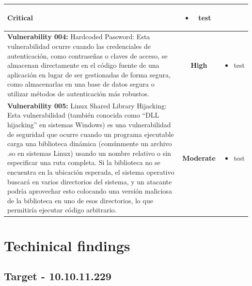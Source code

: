 \documentclass[a4paper]{article} %
\begin{document}
\begin{table}[htbp]
\begin{tabularx}{\textwidth}{|X|c|X|}
            \cellcolor{criticalColor}\textbf{Critical} &
                \begin{itemize}
                    \item test
                \end{itemize} \\
            \hline
            \textbf{Vulnerability 004:} Hardcoded Password: Esta vulnerabilidad ocurre cuando las credenciales de autenticación, como contraseñas o claves de acceso, se almacenan directamente en el código fuente de una aplicación en lugar de ser gestionadas de forma segura, como almacenarlas en una base de datos segura o utilizar métodos de autenticación más robustos.&
            \cellcolor{highColor}\textbf{High} &
                \begin{itemize}
                    \item test
                \end{itemize} \\
            \hline
            \textbf{Vulnerability 005:} Linux Shared Library Hijacking: Esta vulnerabilidad (también conocida como “DLL hijacking” en sistemas Windows) es una vulnerabilidad de seguridad que ocurre cuando un programa ejecutable carga una biblioteca dinámica (comúnmente un archivo .so en sistemas Linux) usando un nombre relativo o sin especificar una ruta completa. Si la biblioteca no se encuentra en la ubicación esperada, el sistema operativo buscará en varios directorios del sistema, y un atacante podría aprovechar esto colocando una versión maliciosa de la biblioteca en uno de esos directorios, lo que permitiría ejecutar código arbitrario.&
            \cellcolor{moderateColor}\textbf{Moderate} &
                \begin{itemize}
                    \item test
                \end{itemize} \\
            \hline
        \end{tabularx}
    \end{table}

    \clearpage

    \section{Techinical findings}
    \subsection{Target - 10.10.11.229}
\end{document}
